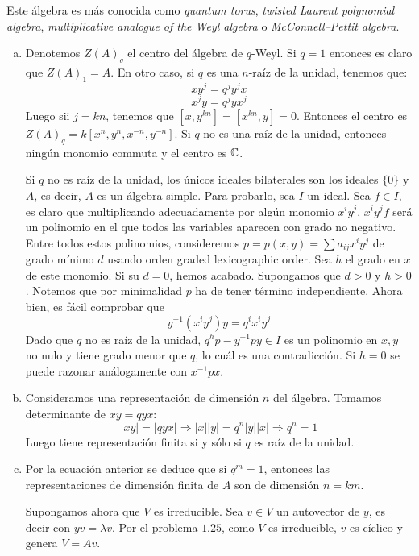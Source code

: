 \documentclass[twoside]{article}
\begin{document}
\begin{solucion}
Este álgebra es más conocida como \textit{quantum torus}, \textit{twisted Laurent polynomial algebra}, \textit{multiplicative analogue of the Weyl algebra} o \textit{McConnell–Pettit algebra}.

\begin{enumerate}[(a)]
\item Denotemos $Z(A)_q$ el centro del álgebra de $q$-Weyl. Si $q=1$ entonces es claro que $Z(A)_1 = A$.
En otro caso, si $q$ es una $n$-raíz de la unidad, tenemos que:
\[ xy^j = q^jy^jx \]
\begin{equation}\label{ejer127-eq1} x^jy = q^jyx^j 
\end{equation}
Luego sii $j=kn$, tenemos que $[x,y^{kn}]=[x^{kn},y]=0$.
Entonces el centro es $Z(A)_q = k[x^n,y^n,x^{-n},y^{-n}]$.
Si $q$ no es una raíz de la unidad, entonces ningún monomio commuta y el centro es $\mathbb{C}$.

Si $q$ no es raíz de la unidad, los únicos ideales bilaterales son los ideales $\{0\}$ y $A$, es decir, $A$ es un álgebra simple. Para probarlo, sea $I$ un ideal. Sea $f \in I$, es claro que multiplicando adecuadamente por algún monomio $x^i y^j$, $x^i y^j f$ será un polinomio en el que todos las variables aparecen con grado no negativo. Entre todos estos polinomios, consideremos $p = p(x,y) = \sum a_{ij}x^i y^j$ de grado mínimo $d$ usando orden graded lexicographic order. Sea $h$ el grado en $x$ de este monomio. Si su $d= 0$, hemos acabado. Supongamos que $d>0$ y $h>0$. Notemos que por minimalidad $p$ ha de tener término independiente. Ahora bien, es fácil comprobar que
$$
y^{-1}(x^i y^j)y = q^i x^i y^j
$$
Dado que $q$ no es raíz de la unidad, $q^hp - y^{-1}py \in I$ es un polinomio en $x,y$ no nulo y tiene grado menor que $q$, lo cuál es una contradicción. Si $h=0$ se puede razonar análogamente con $x^{-1}px$.
\item Consideramos una representación de dimensión $n$ del álgebra.
Tomamos determinante de $xy=qyx$:
\[ |xy| = |qyx| \Rightarrow |x||y| = q^n |y||x| \Rightarrow q^n = 1 \]
Luego tiene representación finita si y sólo si $q$ es raíz de la unidad.

\item Por la ecuación anterior se deduce que si $q^m=1$, entonces las representaciones de dimensión finita de $A$ son de dimensión $n=km$.

Supongamos ahora que $V$ es irreducible.
Sea $v \in V$ un autovector de $y$, es decir con $yv = \lambda v$.
Por el problema $1.25$, como $V$ es irreducible, $v$ es cíclico y genera $V=Av$.


\end{enumerate}
\end{solucion}
\end{document}
